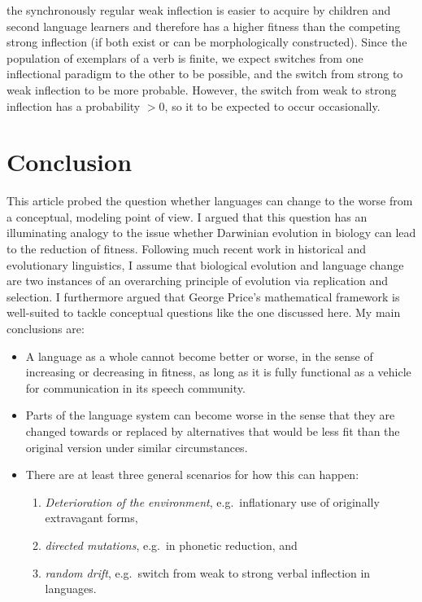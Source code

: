 \documentclass[output=paper,hidelinks]{langscibook}
\begin{document}
the synchronously regular weak inflection is easier to acquire by children and second
language learners and therefore has a higher fitness than the competing strong inflection
(if both exist or can be morphologically constructed). Since the population of exemplars
of a verb is finite, we expect switches from one inflectional paradigm to the other to be
possible, and the switch from strong to weak inflection to be more probable. However, the
switch from weak to strong inflection has a probability $>0$, so it to be expected to
occur occasionally.

\section{Conclusion}

This article probed the question whether languages can change to the worse from a
conceptual, modeling point of view. I argued that this question has an illuminating
analogy to the issue whether Darwinian evolution in biology can lead to the reduction of
fitness. Following much recent work in historical and evolutionary linguistics, I assume
that biological evolution and language change are two instances of an overarching
principle of evolution via replication and selection. I furthermore argued that George
Price's mathematical framework is well-suited to tackle conceptual questions like the one
discussed here. My main conclusions are:

\begin{itemize}
\item A language as a whole cannot become better or worse, in the sense of increasing or
  decreasing in fitness, as long as it is fully functional as a vehicle for communication
  in its speech community.
\item Parts of the language system can become worse in the sense that they are changed
  towards or replaced by alternatives that would be less fit than the original version
  under similar circumstances.
\item There are at least three general scenarios for how this can happen:
  \begin{enumerate}
  \item \emph{Deterioration of the environment}, e.g.\ inflationary use of originally
    extravagant forms,
  \item \emph{directed mutations}, e.g.\ in phonetic reduction, and
  \item \emph{random drift}, e.g.\ switch from weak to strong verbal inflection in
     languages.
  \end{enumerate}
\end{itemize}
\end{document}
